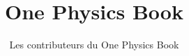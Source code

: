 \documentclass[11pt,a4paper,twoside,openany]{book}
\title{One Physics Book}
\author{Les contributeurs du One Physics Book}
\date{\bookdate}
\begin{document}
\frontmatter




\tableofcontents

\mainmatter



\appendix
\part{\omsolutionspart}


\backmatter
\printindex
\end{document}
